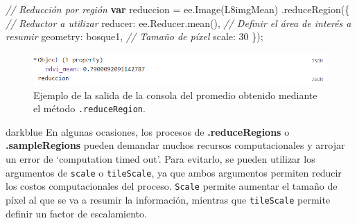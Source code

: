 \documentclass[
  12pt,
  letterpaper,
  twoside]{book}
\newenvironment{Shaded}{\begin{snugshade}}{\end{snugshade}}
\newcommand{\AttributeTok}[1]{\textcolor[rgb]{0.48,0.12,0.64}{#1}}
\newcommand{\CommentTok}[1]{\textcolor[rgb]{0.24,0.58,0.00}{\textit{#1}}}
\newcommand{\ControlFlowTok}[1]{\textcolor[rgb]{0.00,0.00,0.00}{\textbf{#1}}}
\newcommand{\DataTypeTok}[1]{\textcolor[rgb]{0.00,0.00,0.00}{#1}}
\newcommand{\DecValTok}[1]{\textcolor[rgb]{0.28,0.53,0.93}{#1}}
\newcommand{\FunctionTok}[1]{\textcolor[rgb]{0.48,0.12,0.64}{#1}}
\newcommand{\KeywordTok}[1]{\textcolor[rgb]{0.48,0.12,0.64}{#1}}
\newcommand{\NormalTok}[1]{#1}
\newcommand{\OperatorTok}[1]{\textcolor[rgb]{0.00,0.00,0.00}{#1}}
\newcommand\boldpurple[1]{\textcolor{darkpurple}{\textbf{#1}}}
\begin{document}
\begin{Shaded}
\begin{Highlighting}[]
\CommentTok{// Reducción por región}
\ControlFlowTok{var}\NormalTok{ reduccion }\OperatorTok{=} \KeywordTok{ee}\OperatorTok{.}\FunctionTok{Image}\NormalTok{(L8imgMean)}
  \OperatorTok{.}\FunctionTok{reduceRegion}\NormalTok{(\{}
    \CommentTok{// Reductor a utilizar}
    \DataTypeTok{reducer}\OperatorTok{:} \KeywordTok{ee}\OperatorTok{.}\AttributeTok{Reducer}\OperatorTok{.}\FunctionTok{mean}\NormalTok{()}\OperatorTok{,}
    \CommentTok{// Definir el área de interés a resumir}
    \DataTypeTok{geometry}\OperatorTok{:}\NormalTok{ bosque1}\OperatorTok{,}
    \CommentTok{// Tamaño de píxel}
    \DataTypeTok{scale}\OperatorTok{:} \DecValTok{30}
\NormalTok{  \})}\OperatorTok{;}
\end{Highlighting}
\end{Shaded}



\begin{figure}[H]

{\centering \includegraphics[width=0.95\linewidth]{Img/reduccion11} 

}

\caption{Ejemplo de la salida de la consola del promedio obtenido mediante el método \texttt{.reduceRegion}.}\label{fig:fc112}
\end{figure}

\begin{bluebox2}

\begin{awesomeblock}{5pt}{\faLightbulb}{darkblue}
En algunas ocasiones, los procesos de \boldpurple{.reduceRegions} o
\boldpurple{.sampleRegions} pueden demandar muchos recursos computacionales y
arrojar un error de `computation timed out'. Para evitarlo, se pueden
utilizar los argumentos de \texttt{scale} o \texttt{tileScale}, ya que ambos
argumentos permiten reducir los costos computacionales del proceso.
\texttt{Scale} permite aumentar el tamaño de píxel al que se va a resumir la
información, mientras que \texttt{tileScale} permite definir un factor de
escalamiento.

\end{awesomeblock}

\end{bluebox2}
\end{document}
